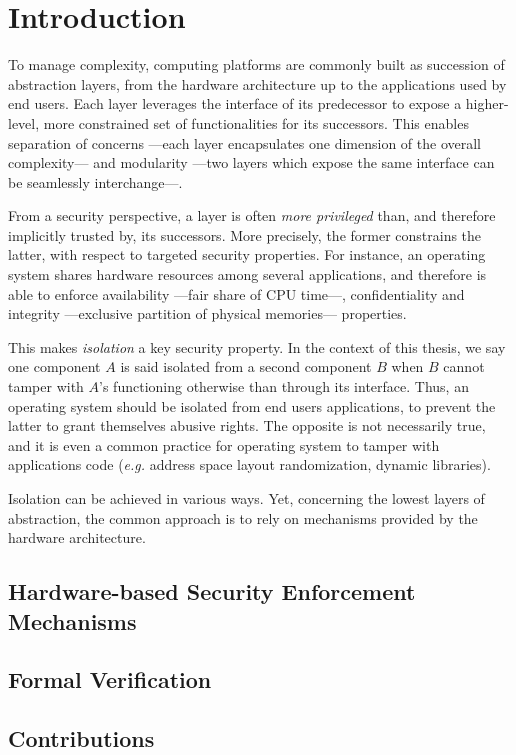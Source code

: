 \chapter{Introduction}


\vspace{1cm}\noindent To manage complexity, computing platforms are commonly
built as succession of abstraction layers, from the hardware architecture up to
the applications used by end users.
%
Each layer leverages the interface of its predecessor to expose a higher-level,
more constrained set of functionalities for its successors.
%
This enables separation of concerns ---each layer encapsulates one dimension of
the overall complexity--- and modularity ---two layers which expose the same
interface can be seamlessly interchange---.

From a security perspective, a layer is often \emph{more privileged} than, and
therefore implicitly trusted by, its successors.
%
More precisely, the former constrains the latter, with respect to targeted
security properties.
%
For instance, an operating system shares hardware resources among several
applications, and therefore is able to enforce availability ---fair share of CPU
time---, confidentiality and integrity ---exclusive partition of physical
memories--- properties.

This makes \emph{isolation} a key security property.
%
In the context of this thesis, we say one component $A$ is said isolated from a
second component $B$ when $B$ cannot tamper with $A$'s functioning otherwise
than through its interface.
%
Thus, an operating system should be isolated from end users applications, to
prevent the latter to grant themselves abusive rights.
%
The opposite is not necessarily true, and it is even a common practice for
operating system to tamper with applications code (\emph{e.g.} address space
layout randomization, dynamic libraries).

Isolation can be achieved in various ways.
%
Yet, concerning the lowest layers of abstraction, the common approach is to rely
on mechanisms provided by the hardware architecture.

\section{Hardware-based Security Enforcement Mechanisms}

\section{Formal Verification}

\section{Contributions}
